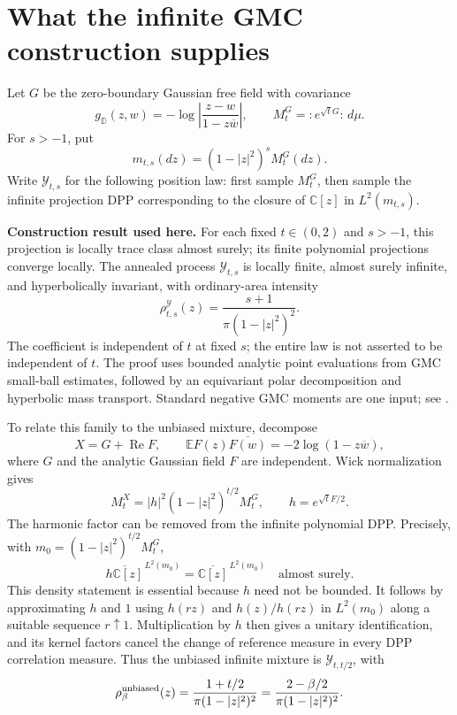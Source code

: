 \documentclass[11pt]{article}
\newcommand{\D}{\mathbb D}
\newcommand{\E}{\mathbb E}
\begin{document}
\section{What the infinite GMC construction supplies}
Let $G$ be the zero-boundary Gaussian free field with covariance
\[
 g_\D(z,w)=-\log\left|\frac{z-w}{1-z\overline w}\right|,
 \qquad M_t^G={:}e^{\sqrt tG}{:}\,d\mu.
\]
For $s>-1$, put
\[
 m_{t,s}(dz)=(1-|z|^2)^sM_t^G(dz).
\]
Write $\mathcal Y_{t,s}$ for the following position law: first sample
$M_t^G$, then sample the infinite projection DPP corresponding to the
closure of $\mathbb C[z]$ in $L^2(m_{t,s})$.

\noindent\textbf{Construction result used here.}
For each fixed $t\in(0,2)$ and $s>-1$, this projection is locally trace
class almost surely; its finite polynomial projections converge locally.
The annealed process $\mathcal Y_{t,s}$ is locally finite, almost surely
infinite, and hyperbolically invariant, with ordinary-area intensity
\begin{equation}\label{family}
 \rho_{t,s}^{\mathcal Y}(z)
 =\frac{s+1}{\pi(1-|z|^2)^2}.
\end{equation}
The coefficient is independent of $t$ at fixed $s$; the entire law is not
asserted to be independent of $t$. The proof uses bounded analytic point
evaluations from GMC small-ball estimates, followed by an equivariant
polar decomposition and hyperbolic mass transport. Standard negative
GMC moments are one input; see \cite{negative}.

To relate this family to the unbiased mixture, decompose
\[
 X=G+\operatorname{Re}F,
 \qquad \E F(z)\overline{F(w)}=-2\log(1-z\overline w),
\]
where $G$ and the analytic Gaussian field $F$ are independent. Wick
normalization gives
\[
 M_t^X=|h|^2(1-|z|^2)^{t/2}M_t^G,
 \qquad h=e^{\sqrt t F/2}.
\]
The harmonic factor can be removed from the infinite polynomial DPP.
Precisely, with $m_0=(1-|z|^2)^{t/2}M_t^G$,
\[
 \overline{h\mathbb C[z]}^{\,L^2(m_0)}
 =\overline{\mathbb C[z]}^{\,L^2(m_0)}\quad\text{almost surely}.
\]
This density statement is essential because $h$ need not be bounded.
It follows by approximating $h$ and $1$ using $h(rz)$ and $h(z)/h(rz)$
in $L^2(m_0)$ along a suitable sequence $r\uparrow1$.
Multiplication by $h$ then gives a unitary identification, and its kernel
factors cancel the change of reference measure in every DPP correlation
measure. Thus the unbiased infinite mixture is $\mathcal Y_{t,t/2}$, with
\begin{equation}\label{unbiased}
 \rho_\beta^{\rm unbiased}(z)
 =\frac{1+t/2}{\pi(1-|z|^2)^2}
 =\frac{2-\beta/2}{\pi(1-|z|^2)^2}.
\end{equation}
\end{document}
